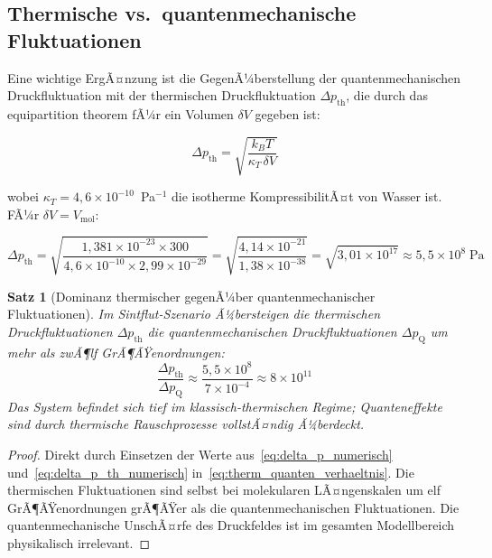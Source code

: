 ﻿\documentclass[12pt,a4paper]{report}
\newtheorem{theorem}{Satz}[chapter]
\begin{document}
\subsection{Thermische vs.\ quantenmechanische Fluktuationen}

Eine wichtige ErgÃ¤nzung ist die GegenÃ¼berstellung der quantenmechanischen Druckfluktuation mit der thermischen Druckfluktuation $\Delta p_\mathrm{th}$, die durch das equipartition theorem fÃ¼r ein Volumen $\delta V$ gegeben ist:

\begin{equation}
	\Delta p_\mathrm{th} = \sqrt{\frac{k_B T}{\kappa_T\,\delta V}}
	\label{eq:delta_p_thermisch}
\end{equation}

wobei $\kappa_T = 4{,}6\times10^{-10}$~Pa$^{-1}$ die isotherme KompressibilitÃ¤t von Wasser ist. FÃ¼r $\delta V = V_\mathrm{mol}$:

\begin{equation}
	\Delta p_\mathrm{th} = \sqrt{\frac{1{,}381\times10^{-23}\times300}{4{,}6\times10^{-10}\times2{,}99\times10^{-29}}} = \sqrt{\frac{4{,}14\times10^{-21}}{1{,}38\times10^{-38}}} = \sqrt{3{,}01\times10^{17}} \approx 5{,}5\times10^{8}\;\text{Pa}
	\label{eq:delta_p_th_numerisch}
\end{equation}

\begin{theorem}[Dominanz thermischer gegenÃ¼ber quantenmechanischer Fluktuationen]
	\label{thm:therm_dominanz}
	Im Sintflut-Szenario Ã¼bersteigen die thermischen Druckfluktuationen $\Delta p_\mathrm{th}$ die quantenmechanischen Druckfluktuationen $\Delta p_\mathrm{Q}$ um mehr als zwÃ¶lf GrÃ¶ÃŸenordnungen:
	\begin{equation}
		\frac{\Delta p_\mathrm{th}}{\Delta p_\mathrm{Q}} \approx \frac{5{,}5\times10^{8}}{7\times10^{-4}} \approx 8\times10^{11}
		\label{eq:therm_quanten_verhaeltnis}
	\end{equation}
	Das System befindet sich tief im klassisch-thermischen Regime; Quanteneffekte sind durch thermische Rauschprozesse vollstÃ¤ndig Ã¼berdeckt.
\end{theorem}

\begin{proof}
	Direkt durch Einsetzen der Werte aus~\eqref{eq:delta_p_numerisch} und~\eqref{eq:delta_p_th_numerisch} in~\eqref{eq:therm_quanten_verhaeltnis}. Die thermischen Fluktuationen sind selbst bei molekularen LÃ¤ngenskalen um elf GrÃ¶ÃŸenordnungen grÃ¶ÃŸer als die quantenmechanischen Fluktuationen. Die quantenmechanische UnschÃ¤rfe des Druckfeldes ist im gesamten Modellbereich physikalisch irrelevant.
\end{proof}
\end{document}
